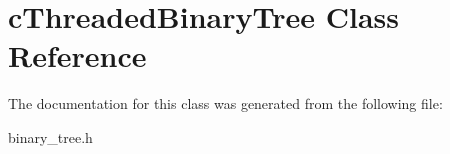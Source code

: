 \hypertarget{classcThreadedBinaryTree}{
\section{c\-Threaded\-Binary\-Tree \-Class \-Reference}
\label{classcThreadedBinaryTree}
}


\-The documentation for this class was generated from the following file\-:\begin{DoxyCompactItemize}
\item 
binary\-\_\-tree.\-h\end{DoxyCompactItemize}
